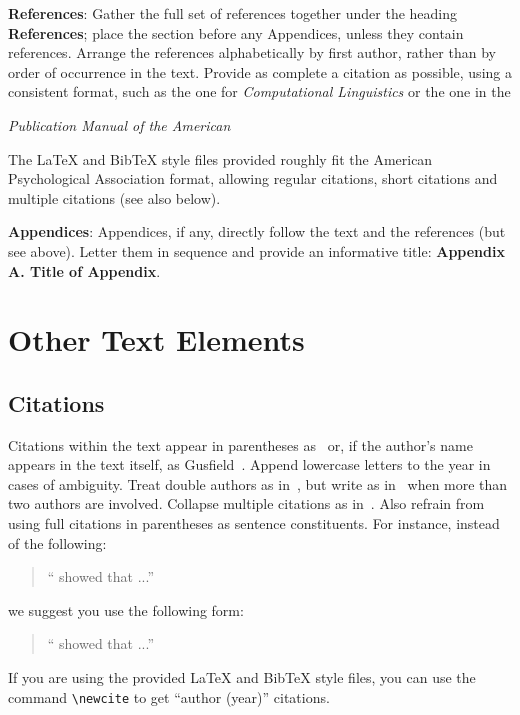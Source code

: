 \documentclass{clarin}
\begin{document}
\textbf{References}: Gather the full set of references together under
the heading {\bf References}; place the section before any Appendices,
unless they contain references. Arrange the references alphabetically
by first author, rather than by order of occurrence in the text.
Provide as complete a citation as possible, using a consistent format,
such as the one for {\em Computational Linguistics\/} or the one in the
{\em Publication Manual of the American

The LaTeX and BibTeX style files provided roughly fit the
American Psychological Association format, allowing regular citations,
short citations and multiple citations (see also below).

{\bf Appendices}: Appendices, if any, directly follow the text and the
references (but see above).  Letter them in sequence and provide an
informative title: {\bf Appendix A. Title of Appendix}.

\section{Other Text Elements}

\subsection{Citations} \label{sec:citations}

Citations within the text appear in parentheses
as~\cite{Gusfield:97} or, if the author's name appears in the text
itself, as Gusfield~.  Append lowercase letters
to the year in cases of ambiguity.  Treat double authors as
in~\cite{Aho:72}, but write as in~\cite{Chandra:81} when more than two
authors are involved. Collapse multiple citations as
in~\cite{Gusfield:97,Aho:72}. Also refrain from using full citations in parentheses
as sentence constituents. For instance, instead of the following:
\begin{quote}
  ``\cite{Gusfield:97} showed that ...''
\end{quote}
we suggest you use the following form:
\begin{quote}
``  showed that ...''
\end{quote}

If you are using the provided LaTeX and BibTeX style files, you
can use the command \verb|\newcite| to get ``author (year)'' citations.

}
\end{document}
